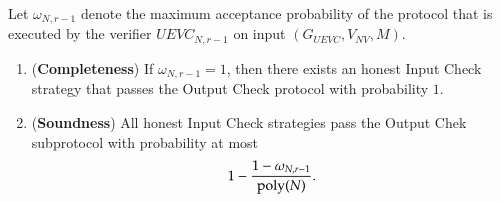 

\begin{theorem}	
\label{thm:output_check}
Let $\omega_{N,r-1}$ denote the maximum acceptance probability of the protocol that is executed by the verifier $UEVC_{N,r-1}$ on input $(G_{UEVC},V_{NV},M)$. 
\begin{enumerate}
	\item (\textbf{Completeness}) If $\omega_{N,r-1} = 1$, then there exists an honest Input Check strategy that passes the Output Check protocol with probability $1$.
	
	\item (\textbf{Soundness}) All honest Input Check strategies pass the Output Chek subprotocol with probability at most 
\[
	1 - \frac{1 - \omega_{N,r-1}}{\operatorname{poly}(N)}.
\] 
\end{enumerate}
\end{theorem}

